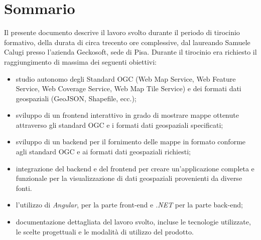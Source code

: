 \cleardoublepage{}
\begingroup
\let\clearpage\relax
\let\cleardoublepage\relax
\let\cleardoublepage\relax

\chapter*{Sommario}

Il presente documento descrive il lavoro svolto durante il periodo di tirocinio formativo, della durata di circa trecento ore complessive, dal laureando Samuele Calugi presso l'azienda Geckosoft, sede di Pisa.
Durante il tirocinio era richiesto il raggiungimento di massima dei seguenti obiettivi:
\begin{itemize}
    \item studio autonomo degli Standard OGC (Web Map Service, Web Feature Service, Web Coverage Service, Web Map Tile Service) e dei formati dati geospaziali (GeoJSON, Shapefile, ecc.);
    \item sviluppo di un frontend interattivo in grado di mostrare mappe ottenute attraverso gli standard OGC e i formati dati geospaziali specificati;
    \item sviluppo di un backend per il fornimento delle mappe in formato conforme agli standard OGC e ai formati dati geospaziali richiesti;
    \item integrazione del backend e del frontend per creare un'applicazione completa e funzionale per la visualizzazione di dati geospaziali provenienti da diverse fonti.
    \item l'utilizzo di \textit{Angular}, per la parte front-end e \textit{.NET} per la parte back-end;
    \item documentazione dettagliata del lavoro svolto, incluse le tecnologie utilizzate, le scelte progettuali e le modalità di utilizzo del prodotto.
\end{itemize}

\endgroup

\vfill